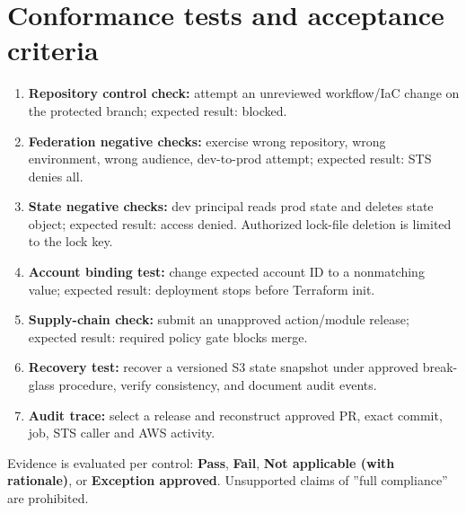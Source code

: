 \documentclass[10pt,letterpaper]{article}
\begin{document}
\section{Conformance tests and acceptance criteria}
\begin{enumerate}
\item \textbf{Repository control check:} attempt an unreviewed workflow/IaC change on the protected branch; expected result: blocked.
\item \textbf{Federation negative checks:} exercise wrong repository, wrong environment, wrong audience, dev-to-prod attempt; expected result: STS denies all.
\item \textbf{State negative checks:} dev principal reads prod state and deletes state object; expected result: access denied. Authorized lock-file deletion is limited to the lock key.
\item \textbf{Account binding test:} change expected account ID to a nonmatching value; expected result: deployment stops before Terraform init.
\item \textbf{Supply-chain check:} submit an unapproved action/module release; expected result: required policy gate blocks merge.
\item \textbf{Recovery test:} recover a versioned S3 state snapshot under approved break-glass procedure, verify consistency, and document audit events.
\item \textbf{Audit trace:} select a release and reconstruct approved PR, exact commit, job, STS caller and AWS activity.
\end{enumerate}
Evidence is evaluated per control: \textbf{Pass}, \textbf{Fail}, \textbf{Not applicable (with rationale)}, or \textbf{Exception approved}. Unsupported claims of ''full compliance'' are prohibited.
\end{document}
